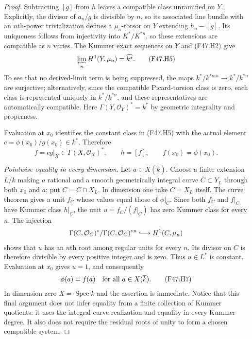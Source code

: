 \begin{proof}
Subtracting $[g]$ from $h$ leaves a compatible class unramified on
$Y$. Explicitly, the divisor of $a_n/g$ is divisible by $n$, so its
associated line bundle with an $n$th-power trivialization defines a
$\mu_n$-torsor on $Y$ extending $h_n-[g]$. Its uniqueness follows
from injectivity into $K^*/K^{*n}$, so these extensions are compatible
as $n$ varies. The Kummer exact sequences on $Y$ and (F47.H2) give
\[
  \varprojlim_n H^1(Y,\mu_n)=\widehat{k^*}.
                                                               \tag{F47.H5}
\]
To see that no derived-limit term is being suppressed, the maps
$k^*/k^{*mn}\to k^*/k^{*n}$ are surjective; alternatively, since the
compatible Picard-torsion class is zero, each class is represented
uniquely in $k^*/k^{*n}$, and these representatives are automatically
compatible. Here $\Gamma(Y,\mathcal O_Y)^*=k^*$ by geometric
integrality and properness.

Evaluation at $x_0$ identifies the constant class in (F47.H5) with the
actual element $c=\phi(x_0)/g(x_0)\in k^*$. Therefore
\[
        f=cg|_X\in\Gamma(X,\mathcal O_X)^*,\qquad
        h=[f],\qquad f(x_0)=\phi(x_0).                 \tag{F47.H6}
\]

\emph{Pointwise equality in every dimension.}
Let $a\in X(\overline k)$. Choose a finite extension $L/k$ making
$a$ rational and a smooth geometrically integral curve
$\overline C\subset Y_L$ through both $x_0$ and $a$; put
$C=\overline C\cap X_L$. In dimension one take $C=X_L$ itself.
The curve theorem gives a unit $f_C$ whose values equal those of
$\phi|_C$. Since both $f_C$ and $f|_C$ have Kummer class $h|_C$,
the unit $u=f_C/(f|_C)$ has zero Kummer class for every $n$. The
injection
\[
  \Gamma(C,\mathcal O_C)^*/\Gamma(C,\mathcal O_C)^{*n}
       \lhook\joinrel\longrightarrow H^1(C,\mu_n)
\]
shows that $u$ has an $n$th root among regular units for every $n$.
Its divisor on $\overline C$ is therefore divisible by every positive
integer and is zero. Thus $u\in L^*$ is constant. Evaluation at
$x_0$ gives $u=1$, and consequently
\[
                         \phi(a)=f(a)
                  \quad\hbox{for all }a\in X(\overline k).
                                                               \tag{F47.H7}
\]
In dimension zero $X=\operatorname{Spec}k$ and the assertion is
immediate. Notice that this final argument does not infer equality
from a finite collection of Kummer quotients: it uses the integral
curve realization and equality in every Kummer degree. It also does
not require the residual roots of unity to form a chosen compatible
system.


\end{proof}
